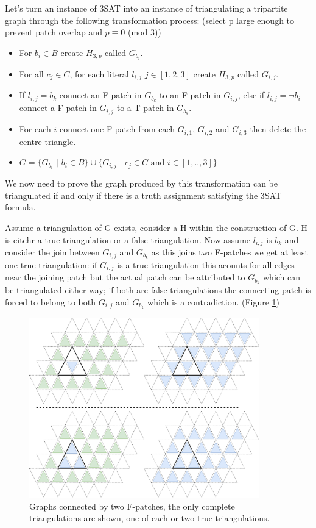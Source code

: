 \documentclass[a4paper,11pt]{report}
\begin{document}
Let's turn an instance of 3SAT into an instance of triangulating a tripartite graph through the following transformation process: (select p large enough to prevent patch overlap and  $p\equiv 0 $ (mod 3))
\begin{itemize}
\item For $b_i\in B$ create $H_{3,p}$ called $G_{b_i}$.
\item For all $c_j\in C$, for each literal $l_{i,j}$ $j\in [1,2,3]$ create $H_{3,p}$ called $G_{i,j}$.
\item If $l_{i,j}=b_k$ connect an F-patch in $G_{b_k}$ to an F-patch in $G_{i,j}$, else if $l_{i,j}=\neg b_i$ connect a F-patch in $G_{i,j}$ to a T-patch in $G_{b_k}$.
\item For each $i$ connect one F-patch from each $G_{i,1}$, $G_{i,2}$ and $G_{i,3}$ then delete the centre triangle. 
\item $G = \{G_{b_i}$ $|$ $b_i \in B\}\cup\{G_{i,j}$ $|$ $ c_j\in C\text{ and }i\in [1,..,3] \}$
\end{itemize}
We now need to prove the graph produced by this transformation can be triangulated if and only if there is a truth assignment satisfying the 3SAT formula.

Assume a triangulation of G exists, consider a H within the construction of G. H is eitehr a true triangulation or a false triangulation. Now assume $l_{i,j}$ is $b_k$ and consider the join between $G_{i,j}$ and $G_{b_k}$ as this joins two F-patches we get at least one true triangulation: if $G_{i,j}$ is a true triangulation this acounts for all edges near the joining patch but the actual patch can be attributed to $G_{b_k}$ which can be triangulated either way; if both are false triangulations the connecting patch is forced to belong to both $G_{i,j}$ and $G_{b_k}$ which is a contradiction. (Figure \ref{holyerone})

\begin{figure}[h!]
\begin{center}
		\includegraphics[width=100mm]{figures/first_holyer_lemma.png}
\end{center}
		\caption{Graphs connected by two F-patches, the only complete triangulations are shown, one of each or two true triangulations.}
\label{holyerone}
\end{figure}
\end{document}
